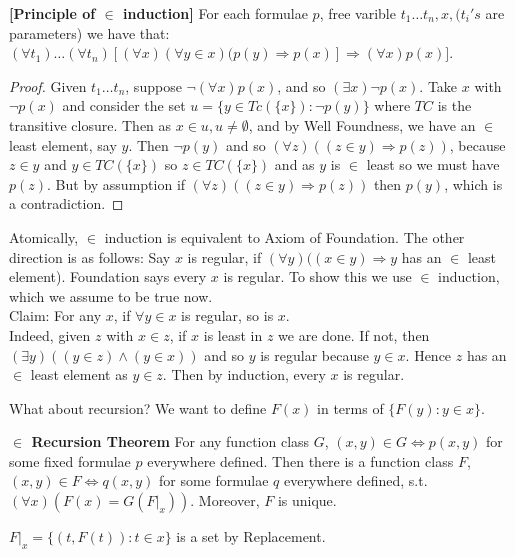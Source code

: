\begin{theorem}{\bf [Principle of $\in$ induction]} For each formulae $p$, free varible $t_1 \ldots t_n, x, (t_i's$ are parameters) we have that:\\
$(\forall t_1) \ldots (\forall t_n)[(\forall x)(\forall y \in x)(p(y) \Rightarrow p(x)] \Rightarrow (\forall x)p(x)]$.
\end{theorem}
\begin{proof} Given $t_1 \ldots t_n$, suppose $\neg (\forall x)p(x)$, and so $(\exists x) \neg p(x)$. Take $x$ with $\neg p(x)$ and consider the set $u = \{y \in Tc(\{x\}): \neg p(y)\}$ where $TC$ is the transitive closure. Then as $x \in u, u \neq \emptyset$, and by Well Foundness, we have an $\in$ least element, say $y$. Then $\neg p(y)$ and so $(\forall z)((z \in y) \Rightarrow p(z))$, because $z \in y$ and $y \in TC(\{x\})$ so $z \in TC(\{x\})$ and as $y$ is $\in$ least so we must have $p(z)$. But by assumption if $(\forall z)((z \in y) \Rightarrow p(z))$ then $p(y)$, which is a contradiction.
\end{proof}
\begin{remark} Atomically, $\in$ induction is equivalent to Axiom of Foundation. The other direction is as follows: Say $x$ is regular, if $(\forall y)((x \in y) \Rightarrow y$ has an $\in$ least element). Foundation says every $x$ is regular. To show this we use $\in$ induction, which we assume to be true now. \\
Claim: For any $x$, if $\forall y \in x$ is regular, so is $x$. \\
Indeed, given $z$ with $x \in z$, if $x$ is least in $z$ we are done. If not, then $(\exists y)((y \in z) \wedge (y \in x))$ and so $y$ is regular because $y \in x$. Hence $z$ has an $\in$ least element as $y \in z$. Then by induction, every $x$ is regular.
\end{remark}
What about recursion? We want to define $F(x)$ in terms of $\{F(y): y \in x\}$.
\begin{theorem}{\bf $\in$ Recursion Theorem} For any function class $G$, $(x,y) \in G \iff p(x,y)$ for some fixed formulae $p$ everywhere defined. Then there is a function class $F$, $(x,y) \in F \iff q(x,y)$ for some formulae $q$ everywhere defined, s.t. $(\forall x)(F(x) = G(F|_x))$. Moreover, $F$ is unique.
\end{theorem}
\begin{remark} $F|_x = \{(t,F(t)): t \in x\}$ is a set by Replacement.
\end{remark}
